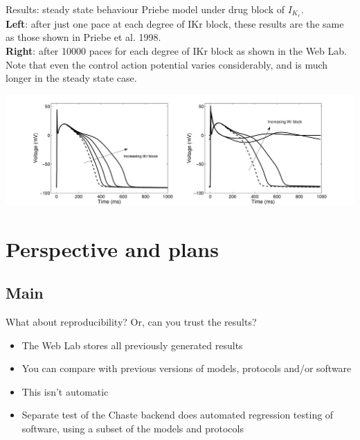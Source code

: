 \documentclass[t,xcolor={usenames,dvipsnames}]{beamer}
\begin{document}
\begin{frame}{Results: steady state behaviour}
Priebe model under drug block of $I_{K_r}$.\\
\textbf{Left}: after just one pace at each degree of IKr block, these results are the same as those shown in Priebe et al. 1998.\\
\textbf{Right}: after 10000 paces for each degree of IKr block as shown in the Web Lab. Note that even the control action potential varies considerably, and is much longer in the steady state case.
\begin{center}
\includegraphics[width=\textwidth]{weblab_fig6}
\end{center}
\end{frame}

\section{Perspective and plans}
\subsection*{Main}

\begin{frame}{What about reproducibility?}
Or, can you trust the results?
\begin{itemize}
\item The Web Lab stores all previously generated results
\item You can compare with previous versions of models, protocols and/or software
\item This isn't automatic
\item Separate test of the Chaste backend does automated regression testing of software, using a subset of the models and protocols
\end{itemize}
\end{frame}
\end{document}
